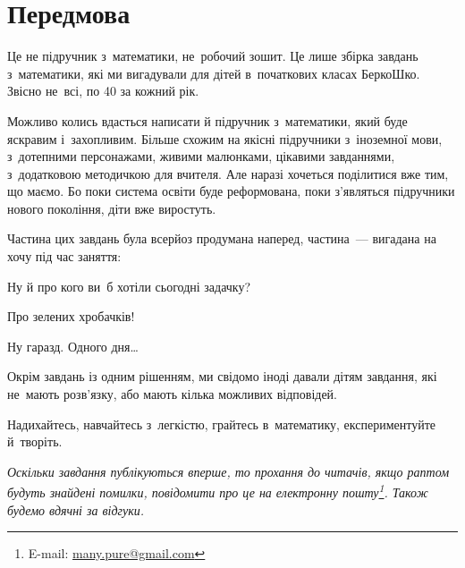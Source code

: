 \chapter*{Передмова}

Це не підручник з~математики, не~робочий зошит.
Це лише збірка завдань з~математики, які ми вигадували для дітей
в~початкових класах БеркоШко.
Звісно не~всі, по 40 за кожний рік.

Можливо колись вдасться написати й підручник з~математики,
який буде яскравим і~захопливим.
Більше схожим на якісні підручники з~іноземної мови, з~дотепними персонажами,
живими малюнками, цікавими завданнями, з~додатковою методичкою для вчителя.
Але наразі хочеться поділитися вже тим, що маємо.
Бо поки система освіти буде реформована, поки з’являться підручники
нового покоління, діти вже виростуть.

Частина цих завдань була всерйоз продумана наперед,
частина~--- вигадана на хочу під час заняття:
\begin{dialogue}
    \item Ну й про кого ви~б хотіли сьогодні задачку?
    \item Про зелених хробачків!
    \item Ну гаразд. Одного дня\ldots
\end{dialogue}

Окрім завдань із одним рішенням, ми свідомо іноді давали дітям завдання,
які не~мають розв’язку, або мають кілька можливих відповідей.

Надихайтесь, навчайтесь з~легкістю, грайтесь в~математику,
експериментуйте й~творіть. \smiley

\medskip
\medskip

\emph{\small
Оскільки завдання публікуються вперше, то прохання до читачів,
якщо раптом будуть знайдені помилки,
повідомити про це на електронну пошту\footnote{
    E-mail: \href{mailto:many.pure@gmail.com}{many.pure@gmail.com}
}. Також будемо вдячні за відгуки.
}%
\smiley
